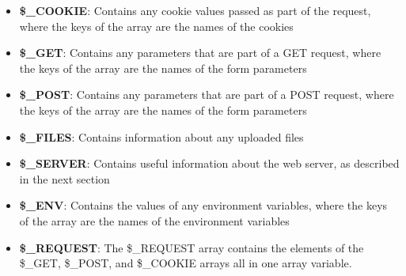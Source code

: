 \documentclass{report}
\begin{document}
\pagebreak 
{}
\bigbreak \noindent 
\begin{itemize}
    \item \textbf{\$\_COOKIE}: Contains any cookie values passed as part of the request, where the keys of the array are the names of the cookies
\item \textbf{\$\_GET}: Contains any parameters that are part of a GET request, where the keys of the array are the names of the form parameters
\item \textbf{\$\_POST}: Contains any parameters that are part of a POST request, where the keys of the array are the names of the form parameters
\item \textbf{\$\_FILES}: Contains information about any uploaded files
\item \textbf{\$\_SERVER}: Contains useful information about the web server, as described in the next section
\item \textbf{\$\_ENV}: Contains the values of any environment variables, where the keys of the array are the names of the environment variables
\item \textbf{\$\_REQUEST}: The \$\_REQUEST array contains the elements of the \$\_GET, \$\_POST, and \$\_COOKIE arrays all in one array variable.
\end{itemize}
\end{document}
